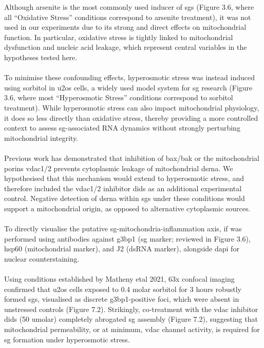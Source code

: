 Although arsenite is the most commonly used inducer of \glspl{sg} (Figure 3.6, where all “Oxidative Stress” conditions correspond to arsenite treatment), it was not used in our experiments due to its strong and direct effects on mitochondrial function\cite{xu_mitochondria_2025}. In particular, oxidative stress is tightly linked to mitochondrial dysfunction and nucleic acid leakage\cite{xu_mitochondria_2025}, which represent central variables in the hypotheses tested here.
\\
\\
To minimise these confounding effects, hyperosmotic stress was instead induced using sorbitol in \gls{u2os} cells, a widely used model system for \gls{sg} research (Figure 3.6, where most “Hyperosmotic Stress” conditions correspond to sorbitol treatment). While hyperosmotic stress can also impact mitochondrial physiology\cite{ikizawa_mitochondria_2023}, it does so less directly than oxidative stress, thereby providing a more controlled context to assess \gls{sg}-associated RNA dynamics without strongly perturbing mitochondrial integrity.
\\
\\
Previous work has demonstrated that inhibition of \gls{bax}/\gls{bak} or the mitochondrial porins \gls{vdac}1/2 prevents cytoplasmic leakage of mitochondrial \gls{dsrna}\cite{krieger_trafficking_2024}. We hypothesised that this mechanism would extend to hyperosmotic stress, and therefore included the \gls{vdac}1/2 inhibitor \gls{dids}\cite{krieger_trafficking_2024} as an additional experimental control. Negative detection of \gls{dsrna} within \glspl{sg} under these conditions would support a mitochondrial origin, as opposed to alternative cytoplasmic sources.
\\
\\
To directly visualise the putative \gls{sg}-mitochondria-inflammation axis, \gls{if} was performed using antibodies against \gls{g3bp1} (\gls{sg} marker; reviewed in Figure 3.6), \gls{hsp60} (mitochondrial marker\cite{el_manaa_transcription-_2021}), and J2 (dsRNA marker\cite{krieger_trafficking_2024}), alongside \gls{dapi} for nuclear counterstaining.
\\
\\
Using conditions established by Matheny \gls{etal} 2021\cite{matheny_rna_2021}, 63x confocal imaging confirmed that \gls{u2os} cells exposed to 0.4 \gls{molar} sorbitol for 3 hours robustly formed \glspl{sg}, visualised as discrete \gls{g3bp1}-positive foci, which were absent in unstressed controls (Figure 7.2). Strikingly, co-treatment with the \gls{vdac} inhibitor \gls{dids} (50 \gls{umolar}) completely abrogated \gls{sg} assembly (Figure 7.2), suggesting that mitochondrial permeability, or at minimum, \gls{vdac} channel activity, is required for \gls{sg} formation under hyperosmotic stress.

